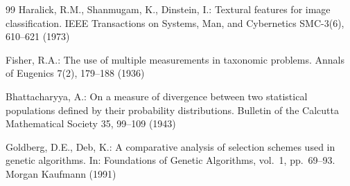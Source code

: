 \documentclass[runningheads]{llncs}
\begin{document}
\begin{thebibliography}{99}
Haralick, R.M., Shanmugam, K., Dinstein, I.: Textural features for image classification. IEEE Transactions on Systems, Man, and Cybernetics SMC-3(6), 610--621 (1973)

Fisher, R.A.: The use of multiple measurements in taxonomic problems. Annals of Eugenics 7(2), 179--188 (1936)

Bhattacharyya, A.: On a measure of divergence between two statistical populations defined by their probability distributions. Bulletin of the Calcutta Mathematical Society 35, 99--109 (1943)

Goldberg, D.E., Deb, K.: A comparative analysis of selection schemes used in genetic algorithms. In: Foundations of Genetic Algorithms, vol.~1, pp.\ 69--93. Morgan Kaufmann (1991)

\end{thebibliography}
\end{document}
